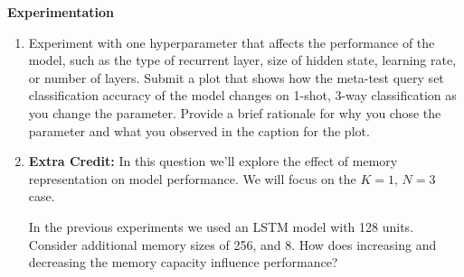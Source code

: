 \item {} {\bf Experimentation}

\begin{enumerate}[label=\alph*]
    \item Experiment with one hyperparameter that affects the performance of the model, such as the type of recurrent layer, size of hidden state, learning rate, or number of layers.  Submit a plot that shows how the meta-test query set classification accuracy of the model changes on 1-shot, 3-way classification as you change the parameter. Provide a brief rationale for why you chose the parameter and what you observed in the caption for the plot.    
    
    \item \textbf{Extra Credit:} In this question we'll explore the effect of memory representation on model performance. We will focus on the $K=1$, $N=3$ case.
    
    In the previous experiments we used an LSTM model with 128 units. Consider additional memory sizes of 256, and 8. How does increasing and decreasing the memory capacity influence performance?
        
\end{enumerate}